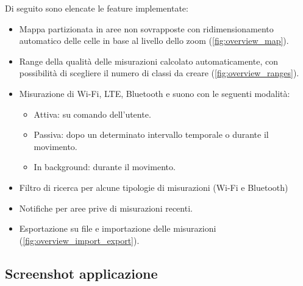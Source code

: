 \documentclass[11pt]{article}
\begin{document}
Di seguito sono elencate le feature implementate:
\begin{itemize}
    \item Mappa partizionata in aree non sovrapposte con ridimensionamento automatico delle celle in base al livello dello zoom (\cref{fig:overview_map}).
    \item Range della qualità delle misurazioni calcolato automaticamente, con possibilità di scegliere il numero di classi da creare (\cref{fig:overview_ranges}).
    \item Misurazione di Wi-Fi, LTE, Bluetooth e suono con le seguenti modalità:
    \begin{itemize}[topsep=0pt]
        \item Attiva: su comando dell'utente.
        \item Passiva: dopo un determinato intervallo temporale o durante il movimento. 
        \item In background: durante il movimento.
    \end{itemize}
    \item Filtro di ricerca per alcune tipologie di misurazioni (Wi-Fi e Bluetooth)
    \item Notifiche per aree prive di misurazioni recenti.
    \item Esportazione su file e importazione delle misurazioni (\cref{fig:overview_import_export}).
\end{itemize}


\subsection{Screenshot applicazione}
\end{document}
